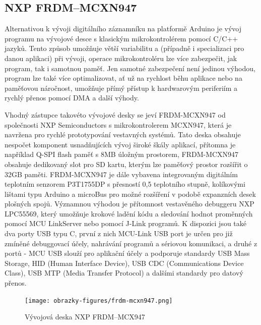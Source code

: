 \subsection{NXP FRDM--MCXN947}
\label{nxp_frdm_mcxn947}
Alternativou k vývoji digitálního záznamníku na platformě Arduino je vývoj programu na vývojové desce s klasickým mikrokontrolérem pomocí C/C++ jazyků. Tento způsob umožňuje větší variabilitu a (případně i specializaci pro danou aplikaci) při vývoji, operace mikrokontroléru lze více zabezpečit, jak program, tak i samotnou paměť. Jen samotné zabezpečení není jedinou výhodou, program lze také více optimalizovat, ať už na rychlost běhu aplikace nebo na paměťovou náročnost, umožňuje přímý přístup k hardwarovým periferiím a rychlý přenos pomocí DMA a další výhody.

Vhodný zástupce takovéto vývojové desky se jeví FRDM-MCXN947 od společnosti NXP Semiconductors s mikrokontrolerem MCXN947, která je navržena pro rychlé prototypování vestavných systémů. Tato deska obsahuje nespočet komponent usnadňujících vývoj široké škály aplikací, přítomna je například Q-SPI flash paměť s 8MB úložným prostorem, FRDM-MCXN947 obsahuje dedikovaný slot pro SD kartu, kterým lze paměťový prostor rozšířit o 32GB paměti. FRDM-MCXN947 je dále vybavena integrovaným digitálním teplotním senzorem P3T1755DP s přesností 0,5 teplotního stupně, kolíkovými lištami typu Arduino a microBus pro možné rozšíření v podobě expanzních desek plošných spojů. Významnou výhodou je přítomnost vestavěného debuggeru NXP LPC55569, který umožňuje krokové ladění kódu a sledování hodnot proměnných pomocí MCU LinkServer nebo pomocí J-Link programů. K dispozici jsou také dva porty USB typu C, první z nich MCU-Link USB port je určen pro již zmíněné debuggovací účely, nahrávání programů a sériovou komunikaci, a druhé z portů - MCU USB slouží pro aplikační účely a podporuje standardy USB Mass Storage, HID (Human Interface Device), USB CDC (Communications Device Class), USB MTP (Media Transfer Protocol) a dalšími standardy pro datový přenos. \cite{nxp_MCX_Nx4x_Reference_Manual, nxp_FRDM_MCXN947_getting_started}

\begin{figure}[h]
    \centering
    \texttt{[image: obrazky-figures/frdm-mcxn947.png]}
    
    \caption{Vývojová deska NXP FRDM--MCX947 \cite{nxp_FRDM_MCXN947_getting_started}}
    \label{fig:frdm-mcxn947}
\end{figure}

